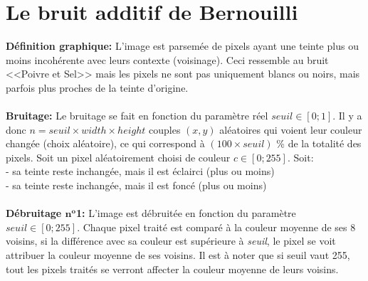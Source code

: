 \documentclass{article}
\begin{document}
	\newpage
	
	
		\section{Le bruit additif de Bernouilli}
		\textbf{Définition graphique: }L'image est parsemée de pixels ayant une teinte plus ou moins incohérente avec leurs contexte (voisinage). Ceci ressemble au bruit <<Poivre et Sel>> mais les pixels ne sont pas uniquement blancs ou noirs, mais parfois plus proches de la teinte d'origine.\\\\
		\textbf{Bruitage: }Le bruitage se fait en fonction du paramètre réel \begin{math}seuil\in[0;1]\end{math}. Il y a donc \begin{math}n = seuil\times width\times height\end{math} couples \begin{math}(x, y)\end{math} aléatoires qui voient leur couleur changée (choix aléatoire), ce qui correspond à \begin{math}(100\times seuil)\end{math} \% de la totalité des pixels. Soit un pixel aléatoirement choisi de couleur \begin{math}c \in [0;255]\end{math}. Soit:\\
		- sa teinte reste inchangée, mais il est éclairci (plus ou moins)\\
		- sa teinte reste inchangée, mais il est foncé (plus ou moins)\\\\
		\textbf{Débruitage \begin{math}\textbf{n}^\textbf{o}\end{math}1: }L'image est débruitée en fonction du paramètre \begin{math}seuil \in [0;255]\end{math}. Chaque pixel traité est comparé à la couleur moyenne de ses 8 voisins, si la différence avec sa couleur est supérieure à \emph{seuil}, le pixel se voit attribuer la couleur moyenne de ses voisins. Il est à noter que si seuil vaut 255, tout les pixels traités se verront affecter la couleur moyenne de leurs voisins.\\\\
\end{document}
